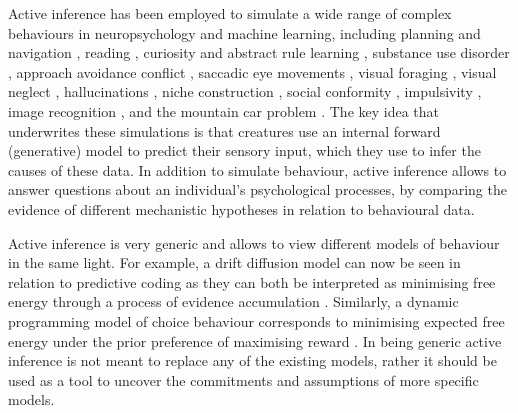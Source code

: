 \documentclass[review,12pt,authoryear]{elsarticle}
\begin{document}
Active inference has been employed to simulate a wide range of complex behaviours in neuropsychology and machine learning, including planning and navigation \citep{kaplanPlanningNavigationActive2018}, reading \citep{fristonDeepTemporalModels2018}, curiosity and abstract rule learning \citep{fristonActiveInferenceCuriosity2017}, substance use disorder \citep{smithImpreciseActionSelection2020}, approach avoidance conflict \citep{smithGreaterDecisionUncertainty2020}, saccadic eye movements \citep{parrActiveInferenceAnatomy2018}, visual foraging \citep{mirzaSceneConstructionVisual2016,parrUncertaintyEpistemicsActive2017}, visual neglect \citep{parrComputationalAnatomyVisual2018}, hallucinations \citep{adamsComputationalAnatomyPsychosis2013}, niche construction \citep{bruinebergFreeenergyMinimizationJoint2018,constantVariationalApproachNiche2018}, social conformity \citep{constantRegimesExpectationsActive2019}, impulsivity \citep{mirzaImpulsivityActiveInference2019}, image recognition \citep{millidgeImplementingPredictiveProcessing2019}, and the mountain car problem \citep{catalBayesianPolicySelection2019,fristonReinforcementLearningActive2009,fristonWhatValueAccumulated2012}. The key idea that underwrites these simulations is that creatures use an internal forward (generative) model to predict their sensory input, which they use to infer the causes of these data. In addition to simulate behaviour, active inference allows to answer questions about an individual's psychological processes, by comparing the evidence of different mechanistic hypotheses in relation to behavioural data.

Active inference is very generic and allows to view different models of behaviour in the same light. For example, a drift diffusion model can now be seen in relation to predictive coding as they can both be interpreted as minimising free energy through a process of evidence accumulation \citep{buckleyFreeEnergyPrinciple2017,bogaczTutorialFreeenergyFramework2017,fristonPredictiveCodingFreeenergy2009}. Similarly, a dynamic programming model of choice behaviour corresponds to minimising expected free energy under the prior preference of maximising reward \citep{dacostaRelationshipDynamicProgramming2020}. In being generic active inference is not meant to replace any of the existing models, rather it should be used as a tool to uncover the commitments and assumptions of more specific models.
\end{document}

